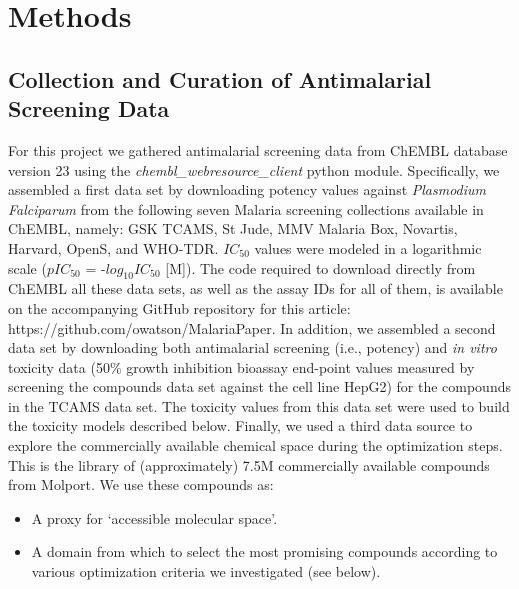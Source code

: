 \documentclass[journal=jacsat,manuscript=article]{achemso}
\begin{document}
\section*{Methods}

\subsection*{Collection and Curation of Antimalarial Screening Data}

For this project we gathered antimalarial screening data from ChEMBL database version 23 using the {\it chembl\_webresource\_client} python module\cite{Davies2015}.
Specifically, we assembled a first data set by downloading potency values against \textit{Plasmodium Falciparum} from the following seven Malaria screening collections available in ChEMBL, namely: GSK TCAMS, St Jude, MMV Malaria Box, Novartis, Harvard, OpenS, and WHO-TDR.
$IC_{50}$ values were modeled in a logarithmic scale ($pIC_{50}$ = -$log_{10} IC_{50}$ [M]). 
The code required to download directly from ChEMBL all these data sets, as well as the assay IDs for all of them, is available on the  accompanying GitHub repository for this article: https://github.com/owatson/MalariaPaper.
\newline
\newline
In addition, we assembled a second data set by downloading both antimalarial screening (i.e., potency) and {\it in vitro} toxicity data (50\% growth inhibition bioassay end-point values measured by screening the compounds data set against the cell line HepG2) for the compounds in the TCAMS data set.
The toxicity values from this data set were used to build the toxicity models described below.
\newline
\newline
Finally, we used a third data source to explore the commercially available chemical space during the optimization steps.  This is the library of (approximately) 7.5M commercially available compounds from Molport.  We use these compounds as: \begin{itemize}
    \item A proxy for `accessible molecular space'.
    \item A domain from which to select the most promising compounds according to various optimization criteria we investigated (see below).
\end{itemize}
\end{document}
